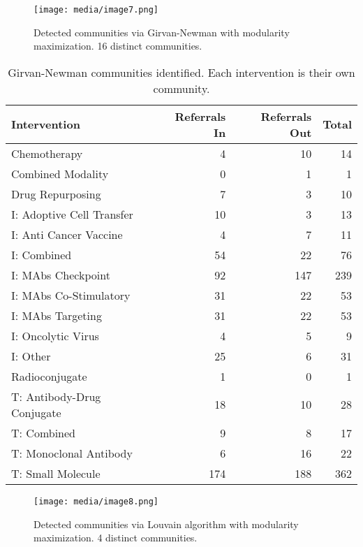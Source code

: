 \documentclass{article}
\begin{document}
\begin{figure}
\centering
\texttt{[image: media/image7.png]}
\caption{Detected communities via Girvan-Newman with
modularity maximization. 16 distinct communities.}
\end{figure}

\begin{table}[htbp]
\centering
\begin{tabular}{lrrr}
\toprule
Intervention & Referrals In & Referrals Out & Total \\ 
\midrule
Chemotherapy & 4 & 10 & 14 \\ 
Combined Modality & 0 & 1 & 1 \\ 
Drug Repurposing & 7 & 3 & 10 \\ 
I: Adoptive Cell Transfer & 10 & 3 & 13 \\ 
I: Anti Cancer Vaccine & 4 & 7 & 11 \\ 
I: Combined & 54 & 22 & 76 \\ 
I: MAbs Checkpoint & 92 & 147 & 239 \\ 
I: MAbs Co-Stimulatory & 31 & 22 & 53 \\ 
I: MAbs Targeting & 31 & 22 & 53 \\ 
I: Oncolytic Virus & 4 & 5 & 9 \\ 
I: Other & 25 & 6 & 31 \\ 
Radioconjugate & 1 & 0 & 1 \\ 
T: Antibody-Drug Conjugate & 18 & 10 & 28 \\ 
T: Combined & 9 & 8 & 17 \\ 
T: Monoclonal Antibody & 6 & 16 & 22 \\ 
T: Small Molecule & 174 & 188 & 362 \\ 
\bottomrule
\end{tabular}
\caption{Girvan-Newman communities identified. Each intervention is their own community.}
\end{table}

\begin{figure}
\centering
\texttt{[image: media/image8.png]}

\caption{Detected communities via Louvain algorithm with
modularity maximization. 4 distinct communities.}
\end{figure}
\end{document}
